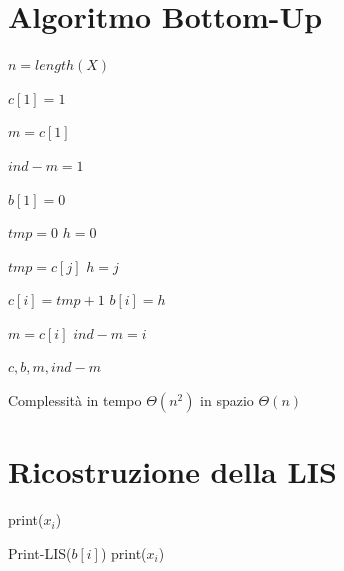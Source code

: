 \section{Algoritmo Bottom-Up}
\begin{algorithm}
    \caption{LIS-LENGTH($n$)}
    \begin{algorithmic}
        
        \State $n=length(X)$

        \State $c[1]=1$ 

        \State $m = c[1]$ 

        
        \State $ind-m=1$ 

        \State $b[1]=0$

         

        \State $tmp = 0$
        \State $h = 0$
        
            \State $tmp=c[j]$
            \State $h=j$
            \EndIf
        \EndFor

        \State $c[i]=tmp+1$
        \State $b[i]=h$

        \State $m=c[i]$
        \State $ind-m=i$
        \EndIf

        \EndFor


        \State \Return $c,b,m,ind-m$
        \EndProcedure
    \end{algorithmic}
\end{algorithm}

Complessità in tempo $\Theta(n^2)$ in spazio $\Theta(n)$


\section{Ricostruzione della LIS}
\begin{algorithm}
    \caption{PRINT-LIS}
    \begin{algorithmic}
            \State print($x_i$)

            \Else
                \State Print-LIS($b[i]$)
                \State print($x_i$)
        \EndIf
        \EndProcedure
    \end{algorithmic}
\end{algorithm}


